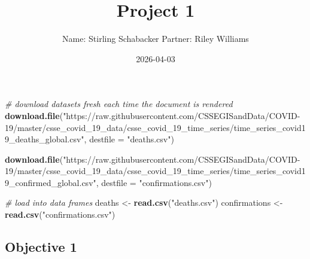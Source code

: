 \documentclass[
]{article}
\title{Project 1}
\author{Name: Stirling Schabacker Partner: Riley Williams}
\date{2026-04-03}
\newenvironment{Shaded}{\begin{snugshade}}{\end{snugshade}}
\newcommand{\AttributeTok}[1]{\textcolor[rgb]{0.13,0.29,0.53}{#1}}
\newcommand{\CommentTok}[1]{\textcolor[rgb]{0.56,0.35,0.01}{\textit{#1}}}
\newcommand{\FunctionTok}[1]{\textcolor[rgb]{0.13,0.29,0.53}{\textbf{#1}}}
\newcommand{\NormalTok}[1]{#1}
\newcommand{\OtherTok}[1]{\textcolor[rgb]{0.56,0.35,0.01}{#1}}
\newcommand{\StringTok}[1]{\textcolor[rgb]{0.31,0.60,0.02}{#1}}
\begin{document}
\maketitle

\begin{Shaded}
\begin{Highlighting}[]
\CommentTok{\# download datasets fresh each time the document is rendered}
\FunctionTok{download.file}\NormalTok{(}\StringTok{"https://raw.githubusercontent.com/CSSEGISandData/COVID{-}19/master/csse\_covid\_19\_data/csse\_covid\_19\_time\_series/time\_series\_covid19\_deaths\_global.csv"}\NormalTok{, }\AttributeTok{destfile =} \StringTok{"deaths.csv"}\NormalTok{)}

\FunctionTok{download.file}\NormalTok{(}\StringTok{"https://raw.githubusercontent.com/CSSEGISandData/COVID{-}19/master/csse\_covid\_19\_data/csse\_covid\_19\_time\_series/time\_series\_covid19\_confirmed\_global.csv"}\NormalTok{, }\AttributeTok{destfile =} \StringTok{"confirmations.csv"}\NormalTok{)}

\CommentTok{\# load into data frames}
\NormalTok{deaths }\OtherTok{\textless{}{-}} \FunctionTok{read.csv}\NormalTok{(}\StringTok{"deaths.csv"}\NormalTok{)}
\NormalTok{confirmations }\OtherTok{\textless{}{-}} \FunctionTok{read.csv}\NormalTok{(}\StringTok{"confirmations.csv"}\NormalTok{)}
\end{Highlighting}
\end{Shaded}

\subsection{Objective 1}\label{objective-1}
\end{document}

